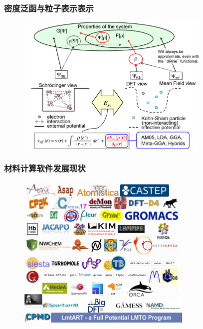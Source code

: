 \frame
{
	\frametitle{密度泛函与粒子表示表示}
\begin{figure}[h!]
\vskip -10pt
\centering
\includegraphics[height=2.65in,width=3.8in,viewport=0 0 362 275,clip]{Figures/DFT-particle-density.png}
\caption{\fontsize{6.0pt}{4.5pt}}%
\label{Schrodinger-equation-vs-Kohn-Sham-equation}
\end{figure}
}

\frame
{
	\frametitle{材料计算软件发展现状}
\begin{figure}[h!]
\vspace*{-0.16in}
\centering
\includegraphics[width=3.30in]{Figures/Softwares_logo.png}
\label{Softwares}
\end{figure}
}

